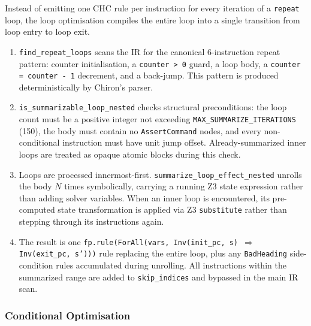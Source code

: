 Instead of emitting one CHC rule per instruction for every iteration of a \texttt{repeat} loop, the loop optimisation compiles the entire loop into a single transition from loop entry to loop exit.
\begin{enumerate}[leftmargin=1.5em, noitemsep, topsep=2pt]
    \item \texttt{find\_repeat\_loops} scans the IR for the canonical 6-instruction repeat pattern: counter initialisation, a \texttt{counter > 0} guard, a loop body, a \texttt{counter = counter - 1} decrement, and a back-jump. This pattern is produced deterministically by Chiron's parser.
    \item \texttt{is\_summarizable\_loop\_nested} checks structural preconditions: the loop count must be a positive integer not exceeding \texttt{MAX\_SUMMARIZE\_ITERATIONS} (150), the body must contain no \texttt{AssertCommand} nodes, and every non-conditional instruction must have unit jump offset. Already-summarized inner loops are treated as opaque atomic blocks during this check.
    \item Loops are processed innermost-first. \texttt{summarize\_loop\_effect\_nested} unrolls the body $N$ times symbolically, carrying a running Z3 state expression rather than adding solver variables. When an inner loop is encountered, its pre-computed state transformation is applied via Z3 \texttt{substitute} rather than stepping through its instructions again.
    \item The result is one \texttt{fp.rule(ForAll(vars, Inv(init\_pc,~s) $\Rightarrow$ Inv(exit\_pc,~s')))} rule replacing the entire loop, plus any \texttt{BadHeading} side-condition rules accumulated during unrolling. All instructions within the summarized range are added to \texttt{skip\_indices} and bypassed in the main IR scan.
\end{enumerate}

\subsubsection*{Conditional Optimisation}

